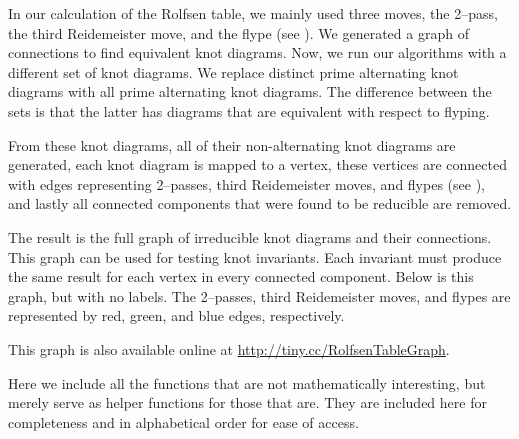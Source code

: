 \begin{paper}


In our calculation of the Rolfsen table, we mainly used three moves, the
2--pass, the third Reidemeister move, and the flype (see \figMoves).
We generated a graph of connections to find equivalent knot diagrams.
Now, we run our algorithms with a different set of knot diagrams.
We replace distinct prime alternating knot diagrams with all prime alternating
knot diagrams.
The difference between the sets is that the latter has diagrams that are
equivalent with respect to flyping.

From these knot diagrams, all of their non-alternating knot diagrams are
generated, each knot diagram is mapped to a vertex, these vertices are connected
with edges representing 2--passes, third Reidemeister moves, and flypes
(see \figMoves), and lastly all connected components that were found to be
reducible are removed.



\noindent{}

The result is the full graph of irreducible knot diagrams and their connections.
This graph can be used for testing knot invariants.
Each invariant must produce the same result for each vertex in every connected
component.
Below is this graph, but with no labels.
The 2--passes, third Reidemeister moves, and flypes are represented by red,
green, and blue edges, respectively.

\noindent{}

This graph is also available online at \url{http://tiny.cc/RolfsenTableGraph}.


Here we include all the functions that are not mathematically interesting, but
merely serve as helper functions for those that are.
They are included here for completeness and in alphabetical order for ease of
access.


\end{paper}
